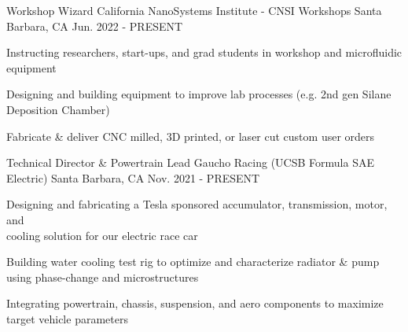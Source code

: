

\begin{cventries}

\cventry
{Workshop Wizard} %
{California NanoSystems Institute - CNSI Workshops} %
{Santa Barbara, CA} %
{Jun. 2022 - PRESENT} %
{ %
\begin{cvitems}
\item {Instructing researchers, start-ups, and grad students in workshop and microfluidic equipment}
\item {Designing and building equipment to improve lab processes (e.g. 2nd gen Silane Deposition Chamber)}
\item {Fabricate \& deliver CNC milled, 3D printed, or laser cut custom user orders }
\end{cvitems}
}


\cventry
{Technical Director \& Powertrain Lead} %
{Gaucho Racing (UCSB Formula SAE Electric)} %
{Santa Barbara, CA} %
{Nov. 2021 - PRESENT} %
{ %
\begin{cvitems}   
\item {Designing and fabricating a Tesla sponsored accumulator, transmission, motor, and \\ cooling solution for our electric race car}
\item {Building water cooling test rig to optimize and characterize radiator \& pump using phase-change and microstructures}
\item {Integrating powertrain, chassis, suspension, and aero components to maximize target vehicle parameters}
\end{cvitems}
}




\end{cventries}
